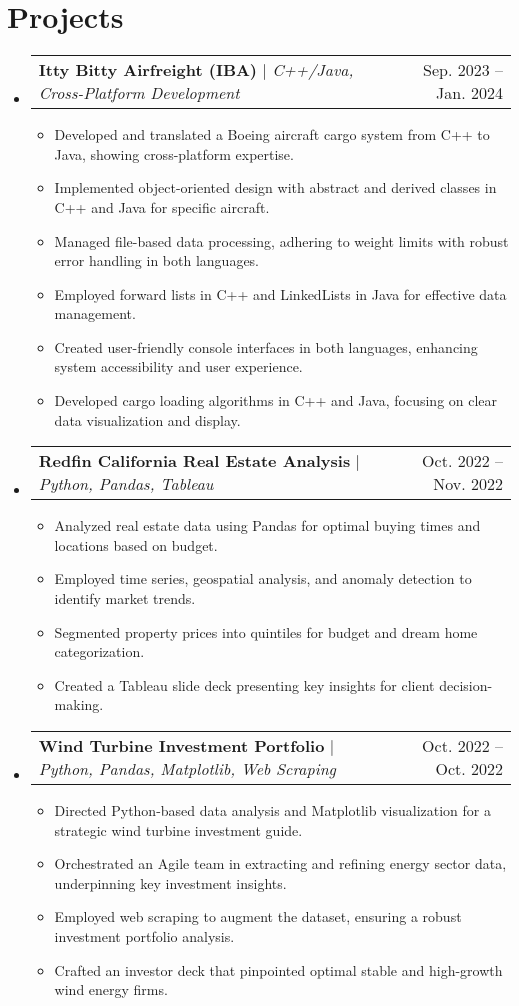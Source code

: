 \documentclass[letterpaper,11pt]{article}
\makeatletter
\newcommand{\resumeItem}[1]{\item\small{{#1 \vspace{-2pt}}}}
\newcommand{\resumeProjectHeading}[2]{\item\begin{tabular*}{0.97\textwidth}{l@{\extracolsep{\fill}}r}\small#1 & #2 \end{tabular*}\vspace{-7pt}}
\newcommand{\smallbullet}{\raisebox{0.3ex}{\scalebox{0.7}{$\bullet$}}} %
\newenvironment{resumeSubHeadingList}{\begin{itemize}[leftmargin=0.15in, label={}]}{\end{itemize}}
\newenvironment{resumeItemList}{\begin{itemize}[label=\smallbullet]}{\end{itemize}\vspace{-5pt}}
\makeatother
\begin{document}
    \section{Projects}
    \label{sec:projects}
    \begin{resumeSubHeadingList}
        \resumeProjectHeading
        {\textbf{Itty Bitty Airfreight (IBA)} $|$ \emph{C++/Java, Cross-Platform Development}}{Sep. 2023 -- Jan. 2024}
        \begin{resumeItemList}
            \resumeItem{Developed and translated a Boeing aircraft cargo system from C++ to Java, showing cross-platform expertise.}
            \resumeItem{Implemented object-oriented design with abstract and derived classes in C++ and Java for specific aircraft.}
            \resumeItem{Managed file-based data processing, adhering to weight limits with robust error handling in both languages.}
            \resumeItem{Employed forward lists in C++ and LinkedLists in Java for effective data management.}
            \resumeItem{Created user-friendly console interfaces in both languages, enhancing system accessibility and user experience.}
            \resumeItem{Developed cargo loading algorithms in C++ and Java, focusing on clear data visualization and display.}
        \end{resumeItemList}

        \resumeProjectHeading
        {\textbf{Redfin California Real Estate Analysis} $|$ \emph{Python, Pandas, Tableau}}{Oct. 2022 -- Nov. 2022}
        \begin{resumeItemList}
            \resumeItem{Analyzed real estate data using Pandas for optimal buying times and locations based on budget.}
            \resumeItem{Employed time series, geospatial analysis, and anomaly detection to identify market trends.}
            \resumeItem{Segmented property prices into quintiles for budget and dream home categorization.}
            \resumeItem{Created a Tableau slide deck presenting key insights for client decision-making.}
        \end{resumeItemList}

        \resumeProjectHeading
        {\textbf{Wind Turbine Investment Portfolio} $|$ \emph{Python, Pandas, Matplotlib, Web Scraping}}{Oct. 2022 -- Oct. 2022}
        \begin{resumeItemList}
            \resumeItem{Directed Python-based data analysis and Matplotlib visualization for a strategic wind turbine investment guide.}
            \resumeItem{Orchestrated an Agile team in extracting and refining energy sector data, underpinning key investment insights.}
            \resumeItem{Employed web scraping to augment the dataset, ensuring a robust investment portfolio analysis.}
            \resumeItem{Crafted an investor deck that pinpointed optimal stable and high-growth wind energy firms.}
        \end{resumeItemList}


\end{resumeSubHeadingList}
\end{document}
